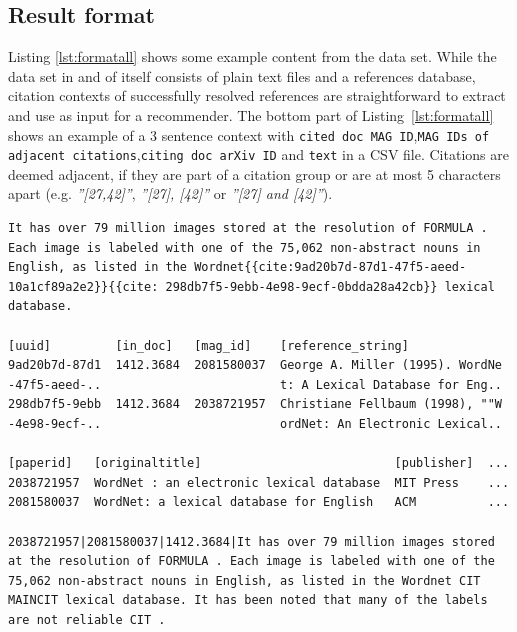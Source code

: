\subsection{Result format}\label{sec:datasetformat}
Listing \ref{lst:formatall} shows some example content from the data set. While the data set in and of itself consists of plain text files and a references database, citation contexts of successfully resolved references are straightforward to extract and use as input for a recommender. The bottom part of Listing~\ref{lst:formatall} shows an example of a 3 sentence context with \texttt{cited doc MAG ID},\hphantom{n}\texttt{MAG IDs of adjacent citations},\hphantom{n}\texttt{citing doc arXiv ID} and \texttt{text} in a CSV file. Citations are deemed adjacent, if they are part of a citation group or are at most 5 characters apart (e.g. \emph{''[27,42]''}, \emph{''[27], [42]''} or \emph{''[27] and [42]''}). %

\begin{lstlisting}[caption={Excerpts from (top to bottom) a plain text file, corresponding data base entries in the references DB, entries in the MAG and extracted citation context CSV.},label={lst:formatall}]
It has over 79 million images stored at the resolution of FORMULA . Each image is labeled with one of the 75,062 non-abstract nouns in English, as listed in the Wordnet{{cite:9ad20b7d-87d1-47f5-aeed-10a1cf89a2e2}}{{cite: 298db7f5-9ebb-4e98-9ecf-0bdda28a42cb}} lexical database.

[uuid]         [in_doc]   [mag_id]    [reference_string]
9ad20b7d-87d1  1412.3684  2081580037  George A. Miller (1995). WordNe
-47f5-aeed-..                         t: A Lexical Database for Eng..
298db7f5-9ebb  1412.3684  2038721957  Christiane Fellbaum (1998), ""W
-4e98-9ecf-..                         ordNet: An Electronic Lexical..

[paperid]   [originaltitle]                           [publisher]  ...
2038721957  WordNet : an electronic lexical database  MIT Press    ...
2081580037  WordNet: a lexical database for English   ACM          ...

2038721957|2081580037|1412.3684|It has over 79 million images stored at the resolution of FORMULA . Each image is labeled with one of the 75,062 non-abstract nouns in English, as listed in the Wordnet CIT MAINCIT lexical database. It has been noted that many of the labels are not reliable CIT .
\end{lstlisting}

